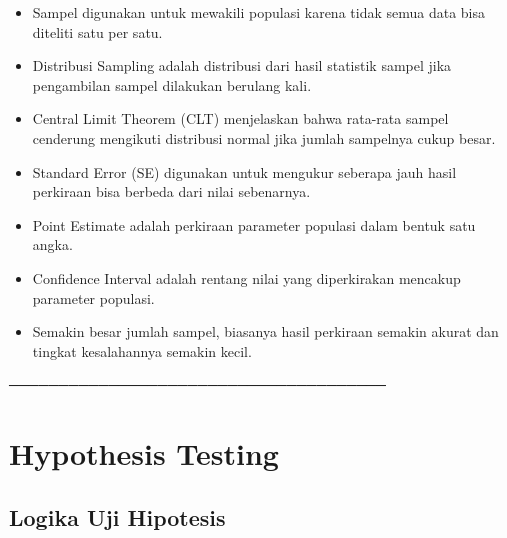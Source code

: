 \documentclass[
  indonesian,
  letterpaper,
]{book}
\providecommand{\tightlist}{%
  \setlength{\itemsep}{0pt}\setlength{\parskip}{0pt}}
\begin{document}
\begin{itemize}
\tightlist
\item
  Sampel digunakan untuk mewakili populasi karena tidak semua data bisa
  diteliti satu per satu.
\item
  Distribusi Sampling adalah distribusi dari hasil statistik sampel jika
  pengambilan sampel dilakukan berulang kali.
\item
  Central Limit Theorem (CLT) menjelaskan bahwa rata-rata sampel
  cenderung mengikuti distribusi normal jika jumlah sampelnya cukup
  besar.
\item
  Standard Error (SE) digunakan untuk mengukur seberapa jauh hasil
  perkiraan bisa berbeda dari nilai sebenarnya.
\item
  Point Estimate adalah perkiraan parameter populasi dalam bentuk satu
  angka.
\item
  Confidence Interval adalah rentang nilai yang diperkirakan mencakup
  parameter populasi.
\item
  Semakin besar jumlah sampel, biasanya hasil perkiraan semakin akurat
  dan tingkat kesalahannya semakin kecil.
\end{itemize}

──────────────────────────────────────


\chapter{Hypothesis Testing}\label{hypothesis-testing}

\section{Logika Uji Hipotesis}\label{logika-uji-hipotesis}
\end{document}
